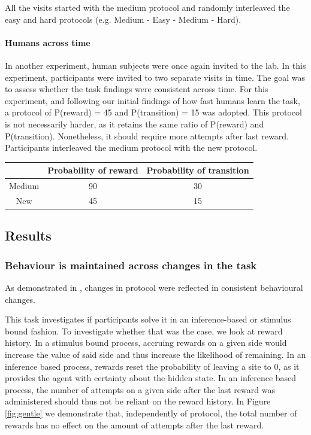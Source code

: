 \documentclass[11pt]{article}
\begin{document}
All the visits started with the medium protocol and randomly interleaved the easy and hard protocols (e.g. Medium - Easy - Medium - Hard).


\paragraph{Humans across time} In another experiment, human subjects were once again invited to the lab. In this experiment, participants were invited to two separate visits in time. The goal was to assess whether the task findings were consistent across time. For this experiment, and following our initial findings of how fast humans learn the task, a protocol of P(reward) = 45 and P(transition) = 15 was adopted. This protocol is not necessarily harder, as it retains the same ratio of P(reward) and P(transition). Nonetheless, it should require more attempts after last reward. Participants interleaved the medium protocol with the new protocol.

\begin{center}
  \begin{tabular}{|c|c|c|}
  \hline
  & Probability of reward & Probability of transition \\
  \hline
  Medium & 90 & 30 \\
  \hline
  New & 45 & 15 \\
  \hline
  \end{tabular}
  \label{table_new}
\end{center}


\subsection{Results}

\subsubsection{Behaviour is maintained across changes in the task}
As demonstrated in \cite{vertechi2020inference}, changes in protocol were reflected in consistent behavioural changes.

This task investigates if participants solve it in an inference-based or stimulus bound fashion. To investigate whether that was the case, we look at reward history. In a stimulus bound process, accruing rewards on a given side would increase the value of said side and thus increase the likelihood of remaining. In an inference based process, rewards reset the probability of leaving a site to 0, as it provides the agent with certainty about the hidden state. In an inference based process, the number of attempts on a given side after the last reward was administered should thus not be reliant on the reward history. In Figure \ref{fig:gentle} we demonstrate that, independently of protocol, the total number of rewards has no effect on the amount of attempts after the last reward.
\end{document}
